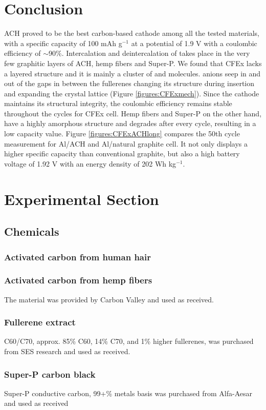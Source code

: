 \documentclass{article}
\begin{document}
\section{Conclusion}
ACH proved to be the best carbon-based cathode among all the tested materials, with a specific capacity of 100 mAh g$^{-1}$ at a potential of 1.9 V with a coulombic efficiency of $\sim$90$\%$. Intercalation and deintercalation of  takes place in the very few graphitic layers of ACH, hemp fibers and Super-P. We found that CFEx lacks a layered structure and it is mainly a cluster of  and  molecules.  anions seep in and out of the gaps in between the fullerenes changing its structure during insertion and expanding the crystal lattice (Figure \ref{figures:CFExmech}). Since the cathode maintains its structural integrity, the coulombic efficiency remains stable throughout the cycles for CFEx cell. Hemp fibers and Super-P on the other hand, have a highly amorphous structure and degrades after every cycle, resulting in a low capacity value. Figure \ref{figures:CFExACHlong} compares the 50th cycle measurement for Al/ACH and Al/natural graphite cell. It not only displays a higher specific capacity than conventional graphite, but also a high battery voltage of 1.92 V with an energy density of 202 Wh kg$^{-1}$.

\section{Experimental Section}
\subsection{Chemicals}
\subsubsection*{Activated carbon from human hair}
\subsubsection*{Activated carbon from hemp fibers}
The material was provided by Carbon Valley and used as received.
\subsubsection*{Fullerene extract}
C60/C70, approx. 85\% C60, 14\% C70, and 1\% higher fullerenes, was purchased from SES research and used as received.
\subsubsection*{Super-P carbon black}
Super-P conductive carbon, 99+\% metals basis was purchased from Alfa-Aesar and used as received
\end{document}
